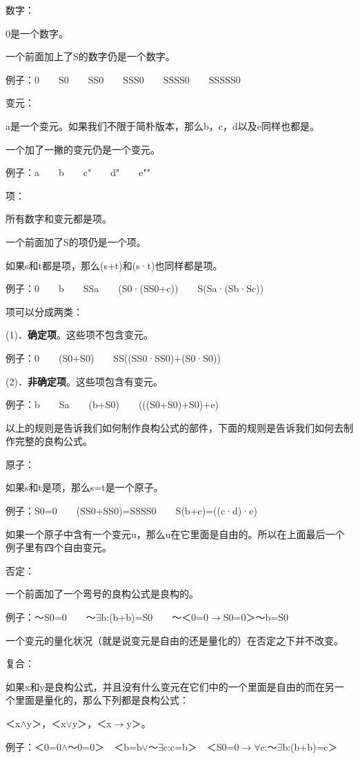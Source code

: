 \documentclass[
  12pt,
  twoside,
  openright,
  oldfontcommands,
]{memoir}
\newcommand{\heititext}[1]{{\heifamily\bfseries #1}}
\begin{document}
数字：

0是一个数字。

一个前面加上了S的数字仍是一个数字。

例子：0　　S0　　SS0　　SSS0　　SSSS0　　SSSSS0

变元：

a是一个变元。如果我们不限于简朴版本，那么b，c，d以及e同样也都是。

一个加了一撇的变元仍是一个变元。

例子：a　　b\textquotesingle{}　　c"　　d"\textquotesingle{}　　e""

项：

所有数字和变元都是项。

一个前面加了S的项仍是一个项。

如果s和t都是项，那么(s+t)和(s·t)也同样都是项。

例子：0　　b　　SSa\textquotesingle{}　　(S0·(SS0+c))　　S(Sa·(Sb·Sc))

项可以分成两类：

(1)．\heititext{确定项}。这些项不包含变元。

例子：0　　(S0+S0)　　SS((SS0·SS0)+(S0·S0))

(2)．\heititext{非确定项}。这些项包含有变元。

例子：b　　Sa　　(b+S0)　　(((S0+S0)+S0)+e)

以上的规则是告诉我们如何制作良构公式的部件，下面的规则是告诉我们如何去制作完整的良构公式。

原子：

如果s和t是项，那么s=t是一个原子。

例子：S0=0　　(SS0+SS0)=SSSS0　　S(b+c)=((c·d)·e)

如果一个原子中含有一个变元u，那么u在它里面是自由的。所以在上面最后一个例子里有四个自由变元。

否定：

一个前面加了一个弯号的良构公式是良构的。

例子：～S0=0　　～$\exists$b:(b+b)=S0　　～＜0=0$\rightarrow$S0=0＞～b=S0

一个变元的量化状况（就是说变元是自由的还是量化的）在否定之下并不改变。

复合：

如果x和y是良构公式，并且没有什么变元在它们中的一个里面是自由的而在另一个里面是量化的，那么下列都是良构公式：

＜x$\wedge$y＞，＜x$\vee$y＞，＜x$\rightarrow$y＞。

例子：＜0=0$\wedge$～0=0＞　＜b=b$\vee$～$\exists$c:c=b＞　＜S0=0$\rightarrow$$\forall$c:～$\exists$b:(b+b)=c＞
\end{document}
